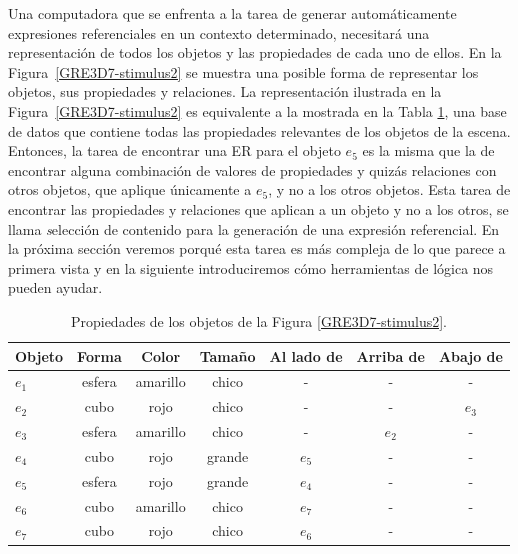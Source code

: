 Una computadora que se enfrenta a la tarea de generar autom\'aticamente expresiones referenciales en un contexto determinado, necesitar\'a una representaci\'on de todos los objetos y las propiedades de cada uno de ellos. En la Figura~\ref{GRE3D7-stimulus2} se muestra una posible forma de representar los objetos, sus propiedades y relaciones. La representaci\'on ilustrada en la Figura~\ref{GRE3D7-stimulus2} es equivalente a la mostrada en la Tabla \ref{tabla-propiedades}, una base de datos que contiene todas
las propiedades relevantes de los objetos de la escena. Entonces, la tarea de encontrar una ER para el objeto $e_5$ es la misma que la de encontrar alguna combinaci\'on de valores de propiedades y quiz\'as relaciones con otros objetos, que aplique \'unicamente a $e_5$, y no a los otros objetos. Esta tarea de encontrar las propiedades y relaciones que aplican a un objeto y no a los otros, se llama {\emph selecci\'on de contenido para la generaci\'on de una expresi\'on referencial}. En la pr\'oxima secci\'on veremos porqu\'e esta tarea es m\'as compleja de lo que parece a primera vista y en la siguiente introduciremos c\'omo herramientas de l\'ogica nos pueden ayudar.


\begin{table}[h!]
\begin{center}
\begin{tabular}{|l|c|c|c|c|c|c|}
\hline
Objeto& 	Forma		&	Color	&	Tama\~no & Al lado de & Arriba de	& Abajo de	\\
\hline
$e_1$ & esfera & amarillo & chico & - & - & -\\
$e_2$ & cubo & rojo & chico & - & - & $e_3$\\
$e_3$ & esfera & amarillo & chico & - & $e_2$ & -\\
$e_4$ & cubo & rojo & grande & $e_5$ & - & -\\
$e_5$ & esfera & rojo & grande & $e_4$ & - & -\\
$e_6$ & cubo & amarillo & chico & $e_7$ & - & -\\
$e_7$ & cubo & rojo & chico & $e_6$ & - & -\\

\hline
\end{tabular}
\caption{Propiedades de los objetos de la Figura \ref{GRE3D7-stimulus2}.}
\vspace*{-.5cm}
\label{tabla-propiedades}
\end{center}
\end{table}

